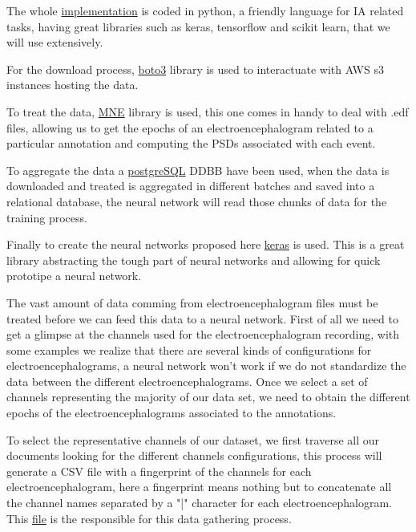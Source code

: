 The whole \href{https://github.com/szz-dvl/soundless/tree/main}{implementation} is coded in python, a friendly language for IA related tasks, having great libraries such as keras, tensorflow and scikit learn, that we will use extensively.

For the download process, \href{https://pypi.org/project/boto3/}{boto3} library is used to interactuate with AWS s3 instances hosting the data.

To treat the data, \href{https://mne.tools/stable/index.html}{MNE} library is used, this one comes in handy to deal with .edf files, allowing us to get the epochs of an electroencephalogram related to a particular annotation and computing the PSDs associated with each event.

To aggregate the data a \href{https://www.postgresql.org/}{postgreSQL} DDBB have been used, when the data is downloaded and treated is aggregated in different batches and saved into a relational database, the neural network will read those chunks of data for the training process.

Finally to create the neural networks proposed here \href{https://keras.io/}{keras} is used. This is a great library abstracting the tough part of neural networks and allowing for quick prototipe a neural network. 

The vast amount of data comming from electroencephalogram files must be treated before we can feed this data to a neural network.
First of all we need to get a glimpse at the channels used for the electroencephalogram recording, with some examples we realize that there are several kinds of configurations for electroencephalograms, a neural network won't work if we do not standardize the data between the different electroencephalograms. Once we select a set of channels representing the majority of our data set, we need to obtain the different epochs of the electroencephalograms associated to the annotations. 

To select the representative channels of our dataset, we first traverse all our documents looking for the different channels configurations, this process will generate a CSV file with a fingerprint of the channels for each electroencephalogram, here a fingerprint means nothing but to concatenate all the channel names separated by a "|" character for each electroencephalogram. This \href{https://github.com/szz-dvl/soundless/blob/main/parser_channels.py}{file} is the responsible for this data gathering process.

